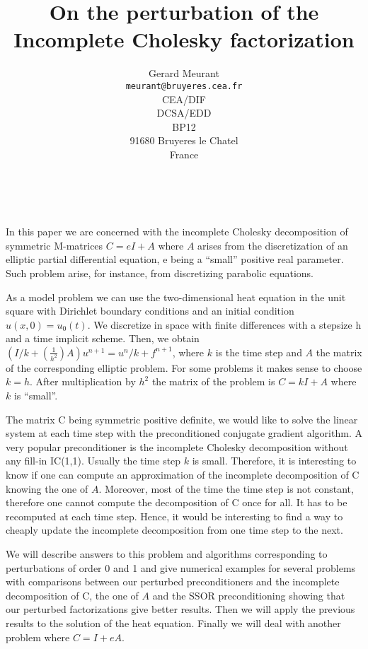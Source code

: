 \documentclass[11pt]{article}
\date{ ~ \hspace{-4mm}}
\title{On the perturbation of the Incomplete Cholesky factorization  }
\author{Gerard Meurant \\ {\tt  meurant@bruyeres.cea.fr} \\ CEA/DIF \\ DCSA/EDD \\ BP12 \\ 91680 Bruyeres le Chatel \\ France}
\begin{document}
\maketitle
\thispagestyle{empty}





 



In this paper we are concerned with the incomplete Cholesky
decomposition of symmetric M-matrices $C=e I +A$ where
$A$ arises from the discretization of an elliptic partial
differential equation, e being a ``small'' positive real
parameter. Such problem arise, for instance, from discretizing
parabolic equations.

As a model problem we can use the two-dimensional heat equation in the
unit
square with Dirichlet boundary conditions and an initial condition
$u(x,0)=u_0(t)$.
We discretize in space with finite differences
with a stepsize  h and a time implicit scheme. Then, we obtain
$(I/k+(\frac1{h^2})A) u^{n+1}=u^n/ k+f^{n+1}$, where
$k$ is the time step and  $A$ the matrix of the corresponding
elliptic problem. For some problems it makes sense to choose
$k=h$. After multiplication by  $h^2$ the matrix of the problem is
$C=kI+A$ where $k$ is ``small''.

The matrix C being symmetric positive definite, we would like to
solve the linear system at each time step with the preconditioned
conjugate gradient algorithm. A very popular preconditioner is the
incomplete Cholesky decomposition without any fill-in  IC(1,1). 
Usually the time step $k$ is
small. Therefore, it is interesting to know if one can compute an
approximation of the incomplete decomposition of C knowing the one
of $A$. Moreover, most of the time the time step is not constant,
therefore one cannot compute the decomposition of C once for
all. It has to be recomputed at each time step. Hence, it would be
interesting to find a way to cheaply update the incomplete
decomposition from one time step to the next.

We will describe answers to this problem and algorithms corresponding to
perturbations of order 0 and 1 and give numerical
examples for several problems with comparisons between our perturbed 
preconditioners and the
incomplete decomposition of  C, the one of $A$ and the SSOR
preconditioning showing that our perturbed factorizations give better
results. 
Then  we will apply the previous results to the solution
of the heat equation. Finally we will deal with another problem where
$C=I+e A$.
\end{document}
